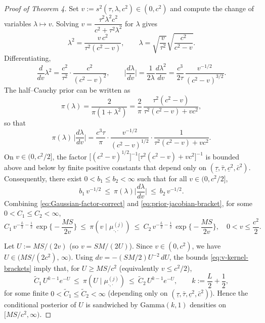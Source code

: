 \documentclass[11pt]{article}
\theoremstyle{plain}
\theoremstyle{definition}
\theoremstyle{plain}
\begin{document}
\begin{proof}[Proof of Theorem 4]
Set $v:=s^2(\tau,\lambda,c^2)\in(0,c^2)$ and compute the change of variables $\lambda\mapsto v$.
Solving
\(
v=\dfrac{\tau^2\lambda^2c^2}{c^2+\tau^2\lambda^2}
\)
for $\lambda$ gives
\[
\lambda^2=\frac{v\,c^2}{\tau^2(c^2-v)},\qquad 
\lambda=\sqrt{\frac{v}{\tau^2}}\sqrt{\frac{c^2}{c^2-v}}.
\]
Differentiating,
\[
\frac{d}{dv}\lambda^2
=\frac{c^2}{\tau^2}\cdot\frac{c^2}{(c^2-v)^2},
\qquad
\Big|\frac{d\lambda}{dv}\Big|
= \frac{1}{2\lambda}\frac{d\lambda^2}{dv}
= \frac{c^3}{2\tau}\,\frac{v^{-1/2}}{(c^2-v)^{3/2}}.
\]
The half--Cauchy prior can be written as
\[
\pi(\lambda)=\frac{2}{\pi(1+\lambda^2)}
=\frac{2}{\pi}\,\frac{\tau^2(c^2-v)}{\tau^2(c^2-v)+v c^2},
\]
so that
\[
\pi(\lambda)\,\Big|\frac{d\lambda}{dv}\Big|
=\frac{c^3\tau}{\pi}\cdot
\frac{v^{-1/2}}{(c^2-v)^{1/2}}\cdot
\frac{1}{\tau^2(c^2-v)+v c^2}.
\]
On $v\in(0,c^2/2]$, the factor $\big[(c^2-v)^{1/2}\big]^{-1}\big[\tau^2(c^2-v)+v c^2\big]^{-1}$ is bounded above and below by finite positive constants that depend only on $(\underline\tau,\bar\tau,\underline c^2,\bar c^2)$. Consequently, there exist $0<b_1\le b_2<\infty$ such that for all $v\in(0,c^2/2]$,
\begin{equation}
\label{eq:prior-jacobian-bracket}
b_1\,v^{-1/2}\ \le\ \pi(\lambda)\Big|\frac{d\lambda}{dv}\Big| \ \le\ b_2\,v^{-1/2}.
\end{equation}
Combining \eqref{eq:Gaussian-factor-correct} and \eqref{eq:prior-jacobian-bracket}, for some $0<C_1\le C_2<\infty$,
\begin{equation}
\label{eq:v-kernel-brackets}
C_1\, v^{-\frac{L}{2}-\frac12}\, \exp\!\Big\{-\frac{M S}{2v}\Big\}
\ \le\ 
\pi(v\mid \mu^{(j)}_{\cdot,\cdot})
\ \le\ 
C_2\, v^{-\frac{L}{2}-\frac12}\, \exp\!\Big\{-\frac{M S}{2v}\Big\},
\quad 0<v\le \frac{c^2}{2}.
\end{equation}

Let $U:=M S/(2v)$ (so $v=S M/(2U)$). Since $v\in(0,c^2)$, we have $U\in\big(MS/(2c^2),\,\infty\big)$. Using $dv=-(SM/2)U^{-2}\,dU$, the bounds \eqref{eq:v-kernel-brackets} imply that, for $U\ge MS/c^2$ (equivalently $v\le c^2/2$),
\begin{equation}
\label{eq:U-gamma-brackets}
\tilde C_1\, U^{k-1}e^{-U}
\ \le\ 
\pi(U\mid \mu^{(j)}_{\cdot,\cdot})
\ \le\ 
\tilde C_2\, U^{k-1}e^{-U},
\qquad
k:=\frac{L}{2}+\frac12,
\end{equation}
for some finite $0<\tilde C_1\le \tilde C_2<\infty$ (depending only on $(\underline\tau,\bar\tau,\underline c^2,\bar c^2)$). Hence the conditional posterior of $U$ is sandwiched by $\mathrm{Gamma}(k,1)$ densities on $[MS/c^2,\infty)$.


\end{proof}
\end{document}
